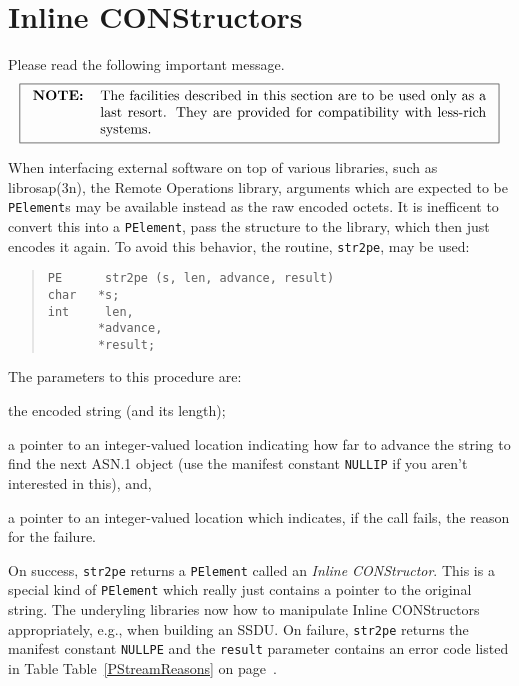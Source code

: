 \section	{Inline CONStructors}
Please read the following important message.
\[\fbox{\begin{tabular}{lp{0.8\textwidth}}
\bf NOTE:&	The facilities described in this section are to be used only
		as a last resort.
		They are provided for compatibility with less-rich systems.
\end{tabular}}\]

When interfacing external software on top of various libraries,
such as \man librosap(3n),
the Remote Operations library,
arguments which are expected to be \verb"PElement"s may be available instead
as the raw encoded octets.
It is inefficent to convert this into a \verb"PElement",
pass the structure to the library,
which then just encodes it again.
To avoid this behavior,
the routine, \verb"str2pe", may be used:
\begin{quote}\small\begin{verbatim}
PE      str2pe (s, len, advance, result)
char   *s;
int     len,
       *advance,
       *result;
\end{verbatim}\end{quote}
The parameters to this procedure are:
\begin{describe}
\item[\verb"s"/\verb"len":] the encoded string (and its length);

\item[\verb"advance":] a pointer to an integer-valued location indicating
how far to advance the string to find the next ASN.1 object
(use the manifest constant \verb"NULLIP" if you aren't interested in this),
and,

\item[\verb"result":] a pointer to an integer-valued location which indicates,
if the call fails, the reason for the failure.
\end{describe}
On success,
\verb"str2pe" returns a \verb"PElement" called an {\em Inline CONStructor}.
This is a special kind of \verb"PElement" which really just contains a pointer
to the original string.
The underyling libraries now how to manipulate Inline CONStructors
appropriately,
e.g., when building an SSDU.
On failure,
\verb"str2pe" returns the manifest constant \verb"NULLPE" and the
\verb"result" parameter contains an error code listed in Table
Table~\ref{PStreamReasons} on page~\pageref{PStreamReasons}.

